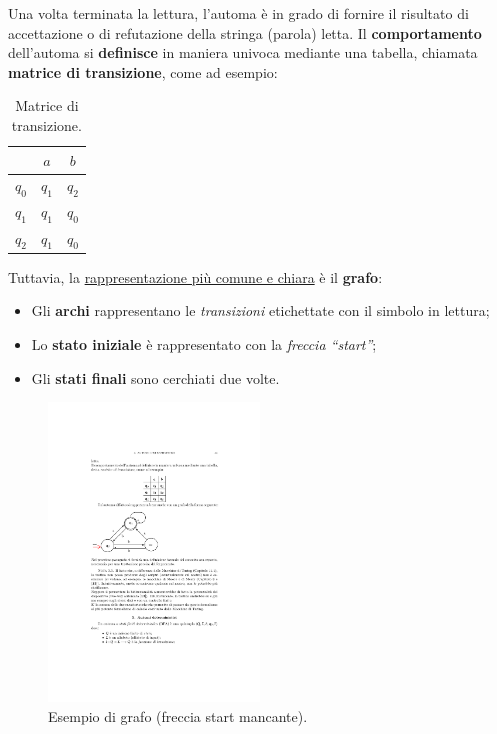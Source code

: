 \documentclass[a4paper]{article}
\begin{document}
	Una volta terminata la lettura, l'automa è in grado di fornire il risultato di accettazione o di refutazione della stringa (parola) letta. Il \textbf{comportamento} dell'automa si \textbf{definisce} in maniera univoca mediante una tabella, chiamata \textbf{matrice di transizione}, come ad esempio:
	
	\begin{table}[!htbp]
		\centering
		
		\begin{tabular}{@{} c c c @{}}
			\toprule
			 & $a$ & $b$ \\
			\midrule
			$q_{0}$ & $q_{1}$ & $q_{2}$ \\
			$q_{1}$ & $q_{1}$ & $q_{0}$ \\
			$q_{2}$ & $q_{1}$ & $q_{0}$ \\
			\bottomrule
		\end{tabular}
		
		\caption{Matrice di transizione.}
		\label{matrice_di_transizione}
	\end{table}

	\newpage

	\noindent
	Tuttavia, la \underline{rappresentazione più comune e chiara} è il \textbf{grafo}:
	
	\begin{itemize}
		\item Gli \textbf{archi} rappresentano le \emph{transizioni} etichettate con il simbolo in lettura;
		\item Lo \textbf{stato iniziale} è rappresentato con la \emph{freccia ``start''};
		\item Gli \textbf{stati finali} sono cerchiati due volte.
	\end{itemize}

	\begin{figure}[!htp]
		\centering
		\includegraphics[width=0.5\textwidth]{img/grafo_eg.pdf}
		\caption{Esempio di grafo (freccia start mancante).}
	\end{figure}
\end{document}
